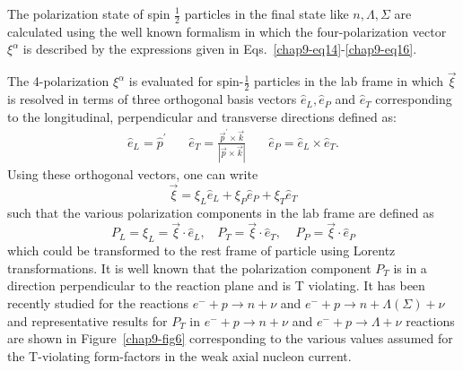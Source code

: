 The polarization state of spin $\frac{1}{2}$ particles in the final state like $n,\Lambda,\Sigma$ are calculated using the well known formalism in which the four-polari\-zation vector $\xi^\alpha$ is described by the expressions given in Eqs.~\ref{chap9-eq14}-\ref{chap9-eq16}.
   

The 4-polarization $\xi^\alpha$ is evaluated for spin-$\frac12$ particles in the lab frame in which $\vec{\xi}$ is resolved in  terms of three orthogonal basis vectors $\hat{e}_L,\hat{e}_P$ and $\hat{e}_T$ corresponding to the longitudinal, perpendicular and transverse directions defined as:
\begin{eqnarray}
\hat{e}_L= \hat{p}^\prime ~~~~~~~~ \hat{e}_T=\frac{\vec{p}^\prime\times \vec{k}}{|\vec{p}\times\vec{k}|}~~~~~~~~\hat{e}_P=\hat{e}_L\times\hat{e}_T. \label{chap9-eq41}
\end{eqnarray}
Using these orthogonal vectors, one can write
\begin{equation}
\vec{\xi}=\xi_L\hat{e}_L+\xi_P\hat{e}_P+\xi_T\hat{e}_T \label{chap9-eq42}
\end{equation}
such that the various polarization components in the lab frame are defined as 
\begin{equation}
P_{L}= \xi_L =\vec{\xi}\cdot \hat{e}_L,~~~~P_T=\vec{\xi}\cdot \hat{e}_T,~~~~~P_P=\vec{\xi}\cdot \hat{e}_P \label{chap9-eq43}
\end{equation} 
which could be transformed to the rest frame of particle using Lorentz transformations. It is well known that the polarization component $P_T$ is in a direction perpendicular to the reaction plane and is T violating. It has been recently studied \cite{chap9-key14} for the reactions $e^-+p\rightarrow n+\nu$ and $e^-+p\rightarrow n+\Lambda(\Sigma)+\nu$ and  representative results for $P_T$ in $e^-+p\rightarrow n+\nu$ and $e^-+p\rightarrow \Lambda+\nu$ reactions are shown in Figure~\ref{chap9-fig6} corresponding to the various values assumed for the T-violating form-factors in the weak axial nucleon current. 
\bigskip

